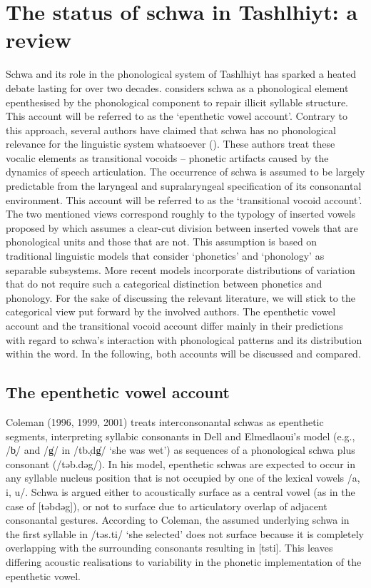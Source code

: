 \section{The status of schwa in Tashlhiyt: a review}\label{sec:6.3}
Schwa and its role in the phonological system of Tashlhiyt has sparked a heated debate lasting for over two decades. \citet{Coleman1996,Coleman1999,Coleman2001} considers schwa as a phonological element epenthesised by the phonological component to repair illicit syllable structure. This account will be referred to as the ‘epenthetic vowel account'. Contrary to this approach, several authors have claimed that schwa has no phonological relevance for the linguistic system whatsoever (\citealt{DE1985,DE1996,DE2002,DE2008,Ridouane2008,FougeronRidouane2008,RidouaneFougeron2011}). These authors treat these vocalic elements as transitional vocoids – phonetic artifacts caused by the dynamics of speech articulation. The occurrence of schwa is assumed to be largely predictable from the laryngeal and supralaryngeal specification of its consonantal environment. This account will be referred to as the ‘transitional vocoid account'. The two mentioned views correspond roughly to the typology of inserted vowels proposed by \citet{Hall2006} which assumes a clear-cut division between inserted vowels that are phonological units and those that are not. This assumption is based on traditional linguistic models that consider ‘phonetics' and ‘phonology' as separable subsystems. More recent models incorporate distributions of variation that do not require such a categorical distinction between phonetics and phonology. For the sake of discussing the relevant literature, we will stick to the categorical view put forward by the involved authors. The epenthetic vowel account and the transitional vocoid account differ mainly in their predictions with regard to schwa’s interaction with phonological patterns and its distribution within the word. In the following, both accounts will be discussed and compared. 

\subsection{The epenthetic vowel account}
Coleman (1996, 1999, 2001) treats interconsonantal schwas as epenthetic segments, interpreting syllabic consonants in Dell and Elmedlaoui’s model (e.g., /b̩/ and /g̍/ in /tb.̩dg̍̍/ ‘she was wet’) as sequences of a phonological schwa plus consonant (/təb.dəg/). In his model, epenthetic schwas are expected to occur in any syllable nucleus position that is not occupied by one of the lexical vowels /a, i, u/. Schwa is argued either to acoustically surface as a central vowel (as in the case of [təbdəg]), or not to surface due to articulatory overlap of adjacent consonantal gestures. According to Coleman, the assumed underlying schwa in the first syllable in /təs.ti/ ‘she selected’ does not surface because it is completely overlapping with the surrounding consonants resulting in [tsti]. This leaves differing acoustic realisations to variability in the phonetic implementation of the epenthetic vowel.  

